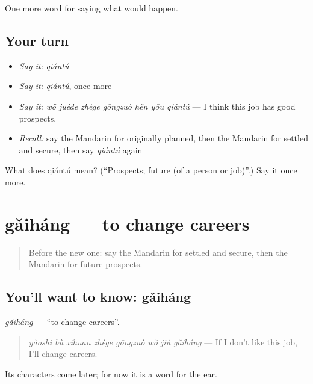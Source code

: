 \begin{grammarlens}[title={What you've built}]
One more word for saying what would happen.
\end{grammarlens}

\subsection*{Your turn}
\begin{itemize}
\raggedright
  \item \emph{Say it:} \emph{qiántú}
  \item \emph{Say it:} \emph{qiántú}, once more
  \item \emph{Say it:} \emph{wǒ juéde zhège gōngzuò hěn yǒu qiántú} — I think this job has good prospects.
  \item \emph{Recall:} say the Mandarin for originally planned, then the Mandarin for settled and secure, then say \emph{qiántú} again
\end{itemize}

\begin{tcolorbox}[breakable,colback=teal!4,colframe=teal!35!black,title={Before you move on}]
What does qiántú mean? (\textquotedblleft{}Prospects; future (of a person or job)\textquotedblright{}.) Say it once more.
\end{tcolorbox}
\section[gǎiháng]{gǎiháng — to change careers}

\label{lesson:ZH-C401-gaihang}



\begin{quote}
Before the new one: say the Mandarin for settled and secure, then the Mandarin for future prospects.
\end{quote}

\subsection*{You'll want to know: gǎiháng}
\emph{gǎiháng} — \textquotedblleft{}to change careers\textquotedblright{}.

\begin{quote}
\emph{yàoshi bù xǐhuan zhège gōngzuò wǒ jiù gǎiháng} — If I don't like this job, I'll change careers.
\end{quote}

Its characters come later; for now it is a word for the ear.

